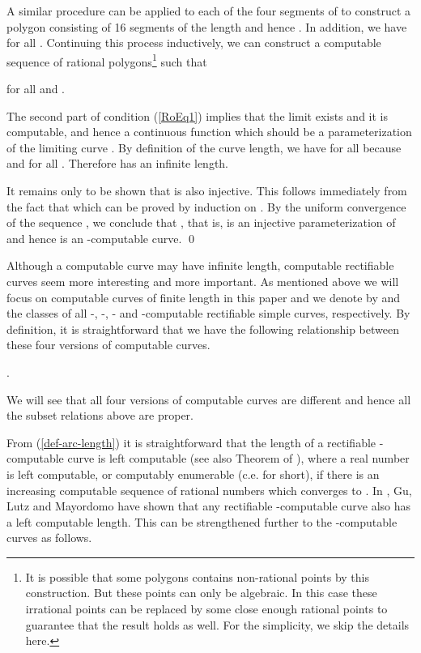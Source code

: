 \documentclass{LMCS}
\theoremstyle{plain}
\begin{document}
A similar procedure can be applied to each of the four segments of  to construct a polygon  consisting of 16 segments of the length  and hence . In addition, we have   for all . Continuing this process inductively, we can construct a computable sequence  of rational polygons\footnote{It is possible that some polygons contains non-rational points by this construction. But these points can only be algebraic. In this case these irrational points can be replaced by some close enough rational points to guarantee that the result holds as well. For the simplicity, we skip the details here. } such that

for all  and .

The second part of condition (\ref{RoEq1}) implies that the limit  exists and it is computable, and hence a continuous function which should be a parameterization of the limiting curve  . By definition of the curve length, we have  for all  because  and   for all . Therefore  has an infinite length.

It remains only to be shown that  is also injective. This follows immediately from the fact that  which can be proved by induction on . By the uniform convergence of the sequence , we conclude that , that is,  is an injective parameterization of  and hence  is an -computable curve.
\qed


Although a computable curve may have infinite length, computable rectifiable curves seem more interesting and more important. As mentioned above we will focus on computable curves of finite length in this paper and we denote by  and  the classes of all -, -, - and -computable rectifiable simple curves, respectively. By definition, it is straightforward that we have the following relationship between these four versions of computable curves.

\begin{thm}\label{Thm-comp-curve-subset}
.
\end{thm}
We will see that all four versions of  computable curves are different and hence all the subset relations above are proper.

From (\ref{def-arc-length}) it is straightforward that the length of a rectifiable -computable curve is left computable (see also Theorem of \cite{MZ2008}), where a real number  is left computable, or computably enumerable (c.e. for short), if there is an increasing computable sequence  of rational numbers which converges to . In \cite{GLM11}, Gu, Lutz and Mayordomo have shown that any rectifiable -computable curve also has a left computable length. This can be strengthened further to the -computable curves as follows.
\end{document}
